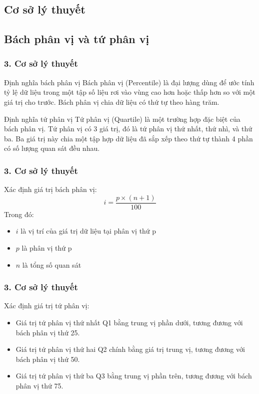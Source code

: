 \documentclass[english,10pt,table]{beamer}
\begin{document}
\begin{frame}
\section{Cơ sở lý thuyết}
\subsection{Bách phân vị và tứ phân vị}
\frametitle{3. Cơ sở lý thuyết}
\begin{block}
{Định nghĩa bách phân vị} 
 Bách phân vị (Percentile) là đại lượng dùng để ước tính tỷ lệ dữ liệu trong một tập số liệu rơi vào vùng cao hơn hoặc thấp hơn so với một giá trị cho trước. Bách phân vị chia dữ liệu có thứ tự theo hàng trăm.
\end{block}
\begin{block}
{Định nghĩa tứ phân vị} 
Tứ phân vị (Quartile) là một trường hợp đặc biệt của bách phân vị. Tứ phân vị có 3 giá trị, đó là tứ phân vị thứ nhất, thứ nhì, và thứ ba. Ba giá trị này chia một tập hợp dữ liệu đã sắp xếp theo thứ tự thành 4 phần có số lượng quan sát đều nhau.
\end{block}

\end{frame}
\begin{frame}
\frametitle{3. Cơ sở lý thuyết}
\begin{block}
{Xác định giá trị bách phân vị:} 
    $$
i=\frac{p \times(n+1)}{100}
$$
Trong đó:
\begin{itemize}
    \item $i$ là vị trí của giá trị dữ liệu tại phân vị thứ p
    \item $p$ là phân vị thứ p
    \item $n$ là tổng số quan sát
\end{itemize}
\end{block}
\end{frame}

\begin{frame}
\frametitle{3. Cơ sở lý thuyết}
\begin{block}
{Xác định giá trị tứ phân vị:} 
\begin{itemize}
    \item Giá trị tứ phân vị thứ nhất Q1 bằng trung vị phần dưới, tương đương với bách phân vị thứ 25.
    \item Giá trị tứ phân vị thứ hai Q2 chính bằng giá trị trung vị, tương đương với bách phân vị thứ 50.
    \item Giá trị tứ phân vị thứ ba Q3 bằng trung vị phần trên, tương đương với bách phân vị thứ 75.
\end{itemize}
\end{block}
\end{frame}
\end{document}
